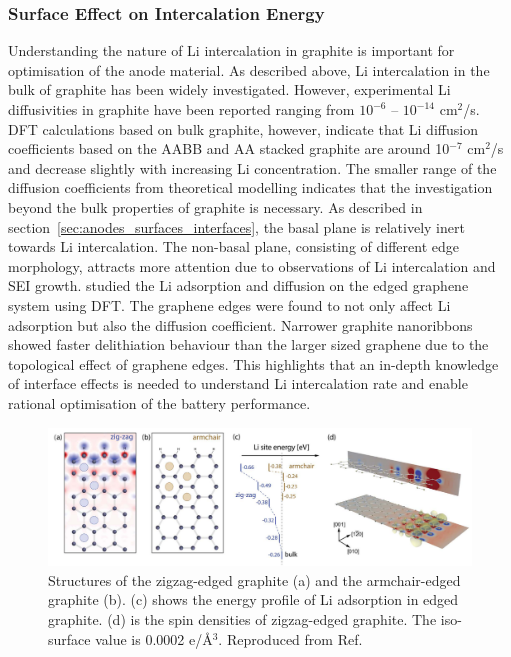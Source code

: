 \documentclass[../main.tex]{subfiles}
\begin{document}
\subsubsection{Surface Effect on Intercalation Energy} 
Understanding the nature of Li intercalation in graphite is important for optimisation of the anode material. As described above, Li intercalation in the bulk of graphite has been widely investigated.\cite{persson2010,toyoura2008first,toyoura2010effects,yao2012diffusion,thinius2014theoretical} However, experimental Li diffusivities in graphite have been reported ranging from $10^{-6}$ -- $10^{-14}$ cm$^2$/s.\cite{toyoura2010effects,takami1995structural,yang2004evaluation,yu1999determination} DFT calculations\cite{persson2010} based on bulk graphite, however, indicate that Li diffusion coefficients based on the AABB and AA stacked graphite are around 10$^{-7}$ cm$^2$/s and decrease slightly with increasing Li concentration.\cite{persson2010} The smaller range of the diffusion coefficients from theoretical modelling indicates that the investigation beyond the bulk properties of graphite is necessary. As described in section~\ref{sec:anodes_surfaces_interfaces}, the basal plane is relatively inert towards Li intercalation.\cite{persson2010lithium} The non-basal plane, consisting of different edge morphology, attracts more attention due to observations of Li intercalation and SEI growth.\cite{liu2019situ,zhang2020operando} \citeauthor{uthaisar2010edge} studied the Li adsorption and diffusion on the edged graphene system using DFT.\cite{uthaisar2010edge} The graphene edges were found to not only affect Li adsorption but also the diffusion coefficient. Narrower graphite nanoribbons showed faster delithiation behaviour than the larger sized graphene due to the topological effect of graphene edges. This highlights that an in-depth knowledge of interface effects is needed to understand Li intercalation rate and enable rational optimisation of the battery performance.

\begin{figure}
    \centering
    \includegraphics[scale=0.6]{figures/Intercalation energies.PNG}
    \caption{Structures of the zigzag-edged graphite (a) and the armchair-edged graphite (b). (c) shows the energy profile of Li adsorption in edged graphite. (d) is the spin densities of zigzag-edged graphite. The iso-surface value is 0.0002 e/\AA$^3$. Reproduced from Ref.~}
    \label{fig:arm_zig}
\end{figure}
\end{document}
